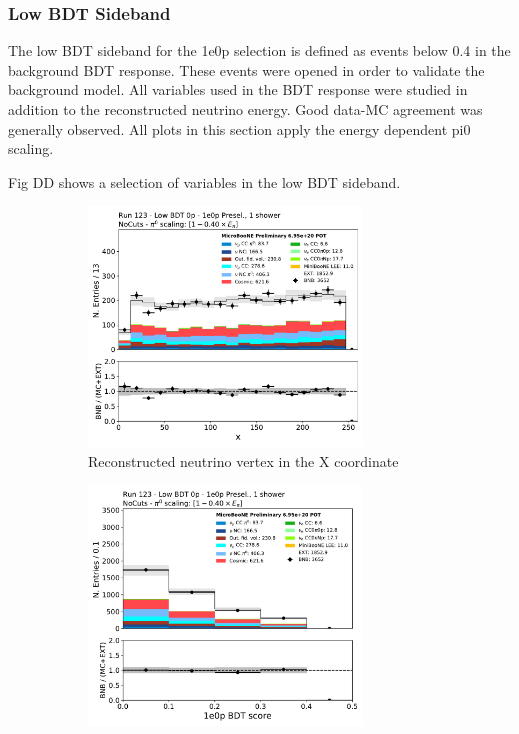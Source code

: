 \subsubsection{Low BDT Sideband}
\label{sec:sideband:1e0p:lowpid}
The low BDT sideband for the 1e0p selection is defined as events below 0.4 in the background BDT response. These events were opened in order to validate the background model. All variables used in the BDT response were studied in addition to the reconstructed neutrino energy. Good data-MC agreement  was generally observed. %
All plots in this section apply the energy dependent pi0 scaling. 

Fig DD shows a selection of variables in the low BDT sideband. 
\begin{figure}[H]
    \centering
    \begin{subfigure}{0.48\textwidth}
    \includegraphics[width=0.8\textwidth]{1e0p/Low_BDT_Sideband/reco_nu_vtx_x.pdf}
    \caption{Reconstructed neutrino vertex in the X coordinate}
    \end{subfigure}
    \begin{subfigure}{0.48\textwidth}
    \includegraphics[width=0.8\textwidth]{1e0p/Low_BDT_Sideband/bkg_score_low_bdt.pdf}

\end{subfigure}
\end{figure}
